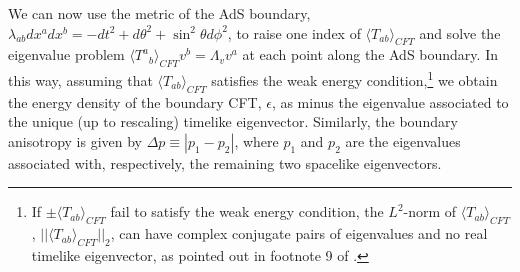\documentclass[a4paper,11pt]{article}
\numberwithin{equation}{section}
\begin{document}
We can now use the metric of the AdS boundary, $\lambda_{ab}dx^a dx^b=-dt^2+d\theta^2+\sin^2\theta d\phi^2$, to raise one index of $\langle T_{ab}\rangle_{CFT}$ and solve the eigenvalue problem $\langle {T^a}_{b}\rangle_{CFT} v^b=\Lambda_v v^a$ at each point along the AdS boundary. In this way, assuming that $\langle T_{ab}\rangle_{CFT}$ satisfies the weak energy condition,\footnote{If $\pm \langle T_{ab}\rangle_{CFT}$ fail to satisfy the weak energy condition, the $L^2$-norm of $\langle T_{ab}\rangle_{CFT}$, $||\langle T_{ab}\rangle_{CFT}||_2$, can have complex conjugate pairs of eigenvalues and no real timelike eigenvector, as pointed out in footnote 9 of \cite{Chesler:2013lia}.} we obtain the energy density of the boundary CFT, $\epsilon$, as minus the eigenvalue associated to the unique (up to rescaling) timelike eigenvector. Similarly, the boundary anisotropy is given by $\Delta p\equiv|p_1-p_2|$, where $p_1$ and $p_2$ are the eigenvalues associated with, respectively, the remaining two spacelike eigenvectors.
\end{document}
